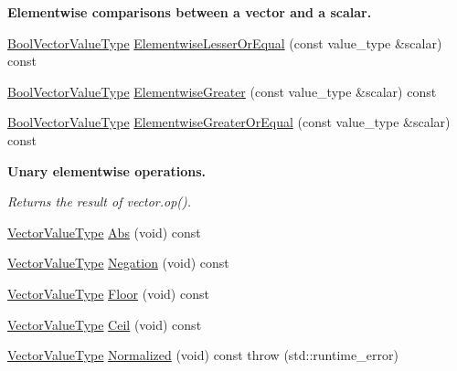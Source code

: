 \begin{Indent}{\bf Elementwise comparisons between a vector and a scalar.}
\begin{DoxyCompactItemize}
\item 
\hyperlink{classvct_fixed_size_const_vector_base_a15899465a75a2f78965bdcf2d6e34bc5}{Bool\+Vector\+Value\+Type} \hyperlink{classvct_fixed_size_const_vector_base_a392251a56025cd31edca7874e62024dd}{Elementwise\+Lesser\+Or\+Equal} (const value\+\_\+type \&scalar) const 
\item 
\hyperlink{classvct_fixed_size_const_vector_base_a15899465a75a2f78965bdcf2d6e34bc5}{Bool\+Vector\+Value\+Type} \hyperlink{classvct_fixed_size_const_vector_base_a6b10ccea0fc8949b4748531b68a0e63b}{Elementwise\+Greater} (const value\+\_\+type \&scalar) const 
\item 
\hyperlink{classvct_fixed_size_const_vector_base_a15899465a75a2f78965bdcf2d6e34bc5}{Bool\+Vector\+Value\+Type} \hyperlink{classvct_fixed_size_const_vector_base_a3c602bf31a8f0db3bcdce403ed8844bd}{Elementwise\+Greater\+Or\+Equal} (const value\+\_\+type \&scalar) const 
\end{DoxyCompactItemize}
\end{Indent}
\begin{Indent}{\bf Unary elementwise operations.}\par
{\em Returns the result of vector.\+op(). }\begin{DoxyCompactItemize}
\item 
\hyperlink{classvct_fixed_size_const_vector_base_a4de94a741a6bb9046e05754c32475ecd}{Vector\+Value\+Type} \hyperlink{classvct_fixed_size_const_vector_base_a21a96c3a0ab1e49ff3a944587a31305d}{Abs} (void) const 
\item 
\hyperlink{classvct_fixed_size_const_vector_base_a4de94a741a6bb9046e05754c32475ecd}{Vector\+Value\+Type} \hyperlink{classvct_fixed_size_const_vector_base_aef8fcf83fd0ecf62ef865c865177da28}{Negation} (void) const 
\item 
\hyperlink{classvct_fixed_size_const_vector_base_a4de94a741a6bb9046e05754c32475ecd}{Vector\+Value\+Type} \hyperlink{classvct_fixed_size_const_vector_base_aff9b482b5a27910cc314cc43385bc2f4}{Floor} (void) const 
\item 
\hyperlink{classvct_fixed_size_const_vector_base_a4de94a741a6bb9046e05754c32475ecd}{Vector\+Value\+Type} \hyperlink{classvct_fixed_size_const_vector_base_aa566ac36b1faa0ff5659e32c508c960c}{Ceil} (void) const 
\item 
\hyperlink{classvct_fixed_size_const_vector_base_a4de94a741a6bb9046e05754c32475ecd}{Vector\+Value\+Type} \hyperlink{classvct_fixed_size_const_vector_base_a5e759e9dd867d0f2752f614716087d6a}{Normalized} (void) const   throw (std\+::runtime\+\_\+error)
\end{DoxyCompactItemize}
\end{Indent}
